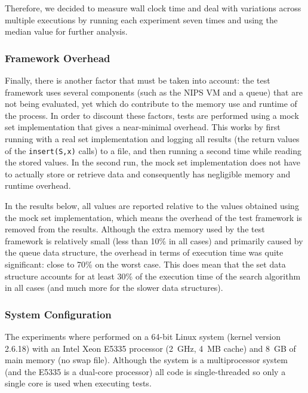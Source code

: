 \documentclass{acm_proc_article-sp}
\begin{document}
Therefore, we decided to measure wall clock time and deal with variations
across multiple executions by running each experiment seven times and using
the median value for further analysis.

\subsubsection{Framework Overhead}
Finally, there is another factor that must be taken into account: the test
framework uses several components (such as the NIPS VM and a queue) that are
not being evaluated, yet which do contribute to the memory use and runtime
of the process. In order to discount these factors, tests are performed using
a mock set implementation that gives a near-minimal overhead. This works
by first running with a real set implementation and logging all results
(the return values of the \verb#insert(S,x)# calls) to a file, and then
running a second time while reading the stored values. In the second run,
the mock set implementation does not have to actually store or retrieve
data and consequently has negligible memory and runtime overhead.

In the results below, all values are reported relative to the values obtained
using the mock set implementation, which means the overhead of the test
framework is removed from the results. Although the extra memory used by
the test framework is relatively small (less than 10\% in all cases) and
primarily caused by the queue data structure, the overhead in terms of
execution time was quite significant: close to 70\% on the worst case.
This does mean that the set data structure accounts for at least 30\%
of the execution time of the search algorithm in all cases (and much
more for the slower data structures).

\subsubsection{System Configuration}
The experiments where performed on a 64-bit Linux system (kernel version 2.6.18)
with an Intel Xeon E5335 processor (2~GHz, 4~MB cache) and 8~GB of main
memory (no swap file). Although the system is a multiprocessor system
(and the E5335 is a dual-core processor) all code is single-threaded so
only a single core is used when executing tests.
\end{document}
